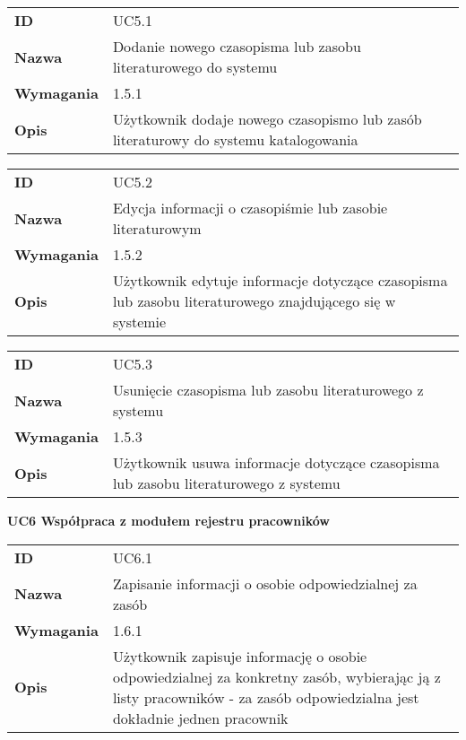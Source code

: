 \begin{tabular}{p{}p{}}
\hfill {\bf ID} & UC5.1 \\
\hfill {\bf Nazwa} & Dodanie nowego czasopisma lub zasobu literaturowego do systemu \\
\hfill {\bf Wymagania} & 1.5.1 \\
\hfill {\bf Opis} & Użytkownik dodaje nowego czasopismo lub zasób literaturowy do systemu katalogowania \\
\end{tabular}

\vspace{.05\textheight}

\begin{tabular}{p{}p{}}
\hfill {\bf ID} & UC5.2 \\
\hfill {\bf Nazwa} & Edycja informacji o czasopiśmie lub zasobie literaturowym  \\
\hfill {\bf Wymagania} & 1.5.2 \\
\hfill {\bf Opis} &  Użytkownik edytuje informacje dotyczące czasopisma lub zasobu literaturowego znajdującego się w systemie \\
\end{tabular}

\vspace{.05\textheight}

\begin{tabular}{p{}p{}}
\hfill {\bf ID} & UC5.3 \\
\hfill {\bf Nazwa} & Usunięcie czasopisma lub zasobu literaturowego z systemu \\
\hfill {\bf Wymagania} & 1.5.3 \\
\hfill {\bf Opis} & Użytkownik usuwa informacje dotyczące czasopisma lub zasobu literaturowego z systemu \\
\end{tabular}

\vspace{.03\textheight}
\begin{center}
  {\Large\bf UC6 Współpraca z modułem rejestru pracowników}
\end{center}
\vspace{.02\textheight}

\begin{tabular}{p{}p{}}
\hfill {\bf ID} & UC6.1 \\
\hfill {\bf Nazwa} &  Zapisanie informacji o osobie odpowiedzialnej za zasób \\
\hfill {\bf Wymagania} & 1.6.1 \\
\hfill {\bf Opis} & Użytkownik zapisuje informację o osobie odpowiedzialnej za konkretny zasób, wybierając ją z listy pracowników - za zasób odpowiedzialna jest dokładnie jednen pracownik \\
\end{tabular}

